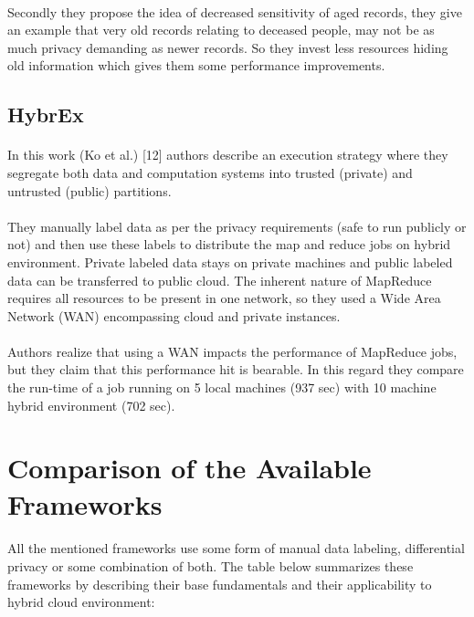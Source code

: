 \documentclass{report}
\begin{document}
\paragraph{}
Secondly they propose the idea of decreased sensitivity of aged records, they give an example that very old records relating to deceased people, may not be as much privacy demanding as newer records. So they invest less resources hiding old information which gives them some performance improvements.
\subsection{HybrEx}
\paragraph{}
In this work (Ko et al.) [12] authors describe an execution strategy where they segregate both data and computation systems into trusted (private) and untrusted (public) partitions.
\paragraph{}
They manually label data as per the privacy requirements (safe to run publicly or not) and then use these labels to distribute the map and reduce jobs on hybrid environment. Private labeled data stays on private machines and public labeled data can be transferred to public cloud. The inherent nature of MapReduce requires all resources to be present in one network, so they used a Wide Area Network (WAN) encompassing cloud and private instances.
\paragraph{}
Authors realize that using a WAN impacts the performance of MapReduce jobs, but they claim that this performance hit is bearable. In this regard they compare the run-time of a job running on 5 local machines (937 sec) with 10 machine hybrid environment (702 sec).

\section{Comparison of the Available Frameworks}
\paragraph{}
All the mentioned frameworks use some form of manual data labeling, differential privacy or some combination of both. The table below summarizes these frameworks by describing their base fundamentals and their applicability to hybrid cloud environment:
\end{document}
